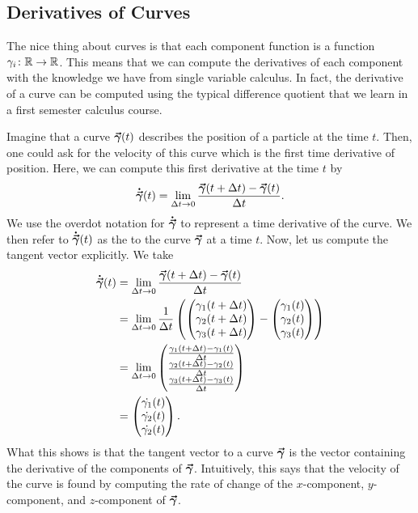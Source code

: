         \subsection{Derivatives of Curves}
        
        The nice thing about curves is that each component function is a function $\gamma_i\colon \mathbb{R} \to \mathbb{R}$. This means that we can compute the derivatives of each component with the knowledge we have from single variable calculus. In fact, the derivative of a curve can be computed using the typical difference quotient that we learn in a first semester calculus course.  
        
        Imagine that a curve $\boldsymbol{\vec{\gamma}}(t)$ describes the position of a particle at the time $t$.  Then, one could ask for the velocity of this curve which is the first time derivative of position.  Here, we can compute this first derivative at the time $t$ by
        \[
        \boldsymbol{\dot{\vec{\gamma}}}(t) = \lim_{\Delta t \to 0} \frac{\boldsymbol{\vec{\gamma}}(t+\Delta t)-\boldsymbol{\vec{\gamma}}(t)}{\Delta t}.
        \]
        We use the overdot notation for $\boldsymbol{\dot{\vec{\gamma}}}$ to represent a time derivative of the curve.  We then refer to $\boldsymbol{\dot{\vec{\gamma}}}(t)$ as the  to the curve $\boldsymbol{\vec{\gamma}}$ at a time $t$. Now, let us compute the tangent vector explicitly.  We take
        \begin{align*}
        	\boldsymbol{\dot{\vec{\gamma}}}(t) &= \lim_{\Delta t \to 0} \frac{\boldsymbol{\vec{\gamma}}(t+\Delta t)-\boldsymbol{\vec{\gamma}}(t)}{\Delta t}\\
        	&= \lim_{\Delta t \to 0} \frac{1}{\Delta t} \left( \begin{pmatrix} \gamma_1(t+\Delta t) \\ \gamma_2(t+\Delta t) \\ \gamma_3(t+\Delta t) \end{pmatrix} - \begin{pmatrix} \gamma_1(t) \\ \gamma_2(t) \\ \gamma_3(t) \end{pmatrix}\right)\\
        	&= \lim_{\Delta t \to 0} \begin{pmatrix} \frac{ \gamma_1(t+\Delta t)-\gamma_1(t)}{\Delta t} \\ \frac{ \gamma_2(t+\Delta t)-\gamma_2(t)}{\Delta t} \\ \frac{ \gamma_3(t+\Delta t)-\gamma_3(t)}{\Delta t} \end{pmatrix}\\
        	&= \begin{pmatrix} \dot{\gamma_1}(t) \\  \dot{\gamma_2}(t) \\ \dot{\gamma_2}(t) \end{pmatrix}.
        \end{align*}
        What this shows is that the tangent vector to a curve $\boldsymbol{\vec{\gamma}}$ is the vector containing the derivative of the components of $\boldsymbol{\vec{\gamma}}$.  Intuitively, this says that the velocity of the curve is found by computing the rate of change of the $x$-component, $y$-component, and $z$-component of $\boldsymbol{\vec{\gamma}}$. 
        
